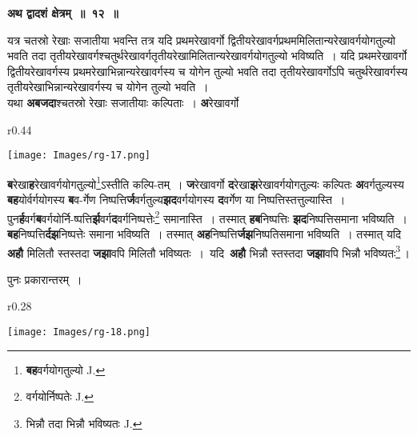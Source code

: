 \documentclass[11pt, openany]{book}
\begin{document}
\begin{center}
\textbf{\large अथ द्वादशं क्षेत्रम्~॥~१२~॥}
\end{center}

{\ab यत्र चतस्रो रेखाः सजातीया भवन्ति तत्र यदि प्रथमरेखावर्गो द्वितीयरेखावर्गप्रथममिलितान्यरेखावर्गयोगतुल्यो भवति तदा तृतीयरेखावर्गश्चतुर्थरेखावर्गतृतीयरेखामिलितान्यरेखावर्गयोगतुल्यो भविष्यति~। यदि प्रथमरेखावर्गो द्वितीयरेखावर्गस्य प्रथमरेखाभिन्नान्यरेखावर्गस्य च योगेन तुल्यो भवति तदा तृतीयरेखावर्गोऽपि चतुर्थरेखावर्गस्य तृतीयरेखाभिन्नान्यरेखावर्गस्य च योगेन तुल्यो भवति~। }\\

 यथा \textbf{अबजदा}श्चतस्रो रेखाः सजातीयाः कल्पिताः~। \textbf{अ}रेखावर्गो 

\newpage

\begin{wrapfigure}{r}{0.44\textwidth}
\vspace{-4mm}
\begin{center}
\texttt{[image: Images/rg-17.png]}
\end{center}
\vspace{-8mm}
\end{wrapfigure}

\textbf{ब}रेखा\textbf{ह}रेखावर्गयोगतुल्यो\renewcommand{\thefootnote}{१}\footnote{\textbf{बह}वर्गयोगतुल्यो {\en J.}}ऽस्तीति कल्पि-तम्~। \textbf{ज}रेखावर्गो \textbf{द}रेखा\textbf{झ}रेखावर्गयोगतुल्यः कल्पितः \textbf{अ}वर्गतुल्यस्य \textbf{बह}योर्वर्गयोगस्य \textbf{ब}व-र्गेण निष्पत्ति\textbf{र्ज}वर्गतुल्य\textbf{झद}वर्गयोगस्य \textbf{द}वर्गेण या निष्पत्तिस्तत्तुल्यास्ति~। पुन\textbf{र्ह}वर्ग\textbf{ब}वर्गयोर्नि-ष्पत्ति\textbf{र्झ}वर्ग\textbf{द}वर्गनिष्पत्तेः\renewcommand{\thefootnote}{२}\footnote{वर्गयोर्निष्पतेः {\en J.}} समानास्ति~। तस्मात् \textbf{हब}निष्पत्तिः \textbf{झद}निष्पत्तिसमाना भविष्यति~। \textbf{बह}निष्पत्ति\textbf{र्दझ}निष्पत्तेः समाना भविष्यति~। तस्मात् \textbf{अह}निष्पत्ति\textbf{र्जझ}निष्पतिसमाना भविष्यति~। तस्मात् यदि \textbf{अहौ} मिलितौ स्तस्तदा \textbf{जझा}वपि \;मिलितौ \;भविष्यतः~। \,यदि \,\textbf{अहौ} भिन्नौ स्तस्तदा \textbf{जझा}वपि भिन्नौ भविष्यतः\renewcommand{\thefootnote}{३}\footnote{भिन्नौ तदा भिन्नौ भविष्यतः {\en J.}}\,। 

\begin{center}
पुनः प्रकारान्तरम्~। 
\end{center}

\begin{wrapfigure}{r}{0.28\textwidth}
\vspace{-10mm}
\begin{center}
\texttt{[image: Images/rg-18.png]}
\end{center}
\vspace{-8mm}
\end{wrapfigure}
\end{document}
